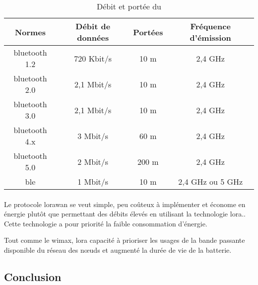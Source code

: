 \begin{table}[ht!]
    \centering
    \begin{tabular}{|c|c|c|c|}
        \hline
        \rowcolor{tableColorDark} Normes & Débit de données & Portées & Fréquence d'émission \\
        \hline

        \gls{bluetooth} 1.2              & 720 Kbit/s       & 10 m    & 2,4 GHz              \\\hline
        \gls{bluetooth} 2.0              & 2,1 Mbit/s       & 10 m    & 2,4 GHz              \\\hline
        \gls{bluetooth} 3.0              & 2,1 Mbit/s       & 10 m    & 2,4 GHz              \\\hline
        \gls{bluetooth} 4.x              & 3 Mbit/s         & 60 m    & 2,4 GHz              \\\hline
        \gls{bluetooth} 5.0              & 2 Mbit/s         & 200 m   & 2,4 GHz              \\\hline
        \gls{ble}                        & 1 Mbit/s         & 10 m    & 2,4 GHz ou 5 GHz     \\\hline
    \end{tabular}
    \label{tab:debitPorteeBluetooth}
    \caption{Débit et portée du }
    \nocite{ble}\nocite{debitPortee}
\end{table}

\paragraph{}
\label{sec:lorawan}

Le protocole \gls{lorawan} se veut simple, peu coûteux à implémenter et économe en énergie plutôt que permettant des débits élevés en
utilisant la technologie \gls{lora}.\cite{lorawan}. Cette technologie a pour priorité la faible consommation d'énergie.\newline

Tout comme le \gls{wimax}, \gls{lora} capacité à prioriser les usages de la bande passante disponible du
réseau des nœuds et augmenté la durée de vie de la batterie.

\begin{table}[ht!]
    \centering
    \label{tab:debitPorteeLora}
    \caption{Débit et portée du }
    \nocite{debitPortee}
\end{table}

\subsection{Conclusion}
\label{sec:comparaisonProtocoleCommnunicationConclusion}
